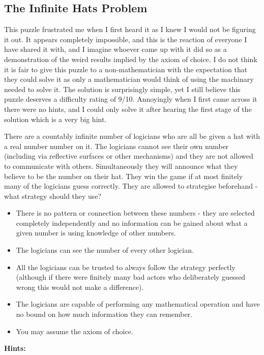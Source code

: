\subsection{The Infinite Hats Problem}

This puzzle frustrated me when I first heard it as I knew I would not be figuring it out. It appears completely impossible, and this is the reaction of everyone I have shared it with, and I imagine whoever came up with it did so as a demonstration of the weird results implied by the axiom of choice. I do not think it is fair to give this puzzle to a non-mathematician with the expectation that they could solve it as only a mathematician would think of using the machinary needed to solve it. The solution is surprisingly simple, yet I still believe this puzzle deserves a difficulty rating of 9/10. Annoyingly when I first came across it there were no hints, and I could only solve it after hearing the first stage of the solution which is a very big hint.

There are a countably infinite number of logicians who are all be given a hat with a real number number on it. The logicians cannot see their own number (including via reflective surfaces or other mechanisms) and they are not allowed to communicate with others. Simultaneously they will announce what they believe to be the number on their hat. They win the game if at most finitely many of the logicians guess correctly. They are allowed to strategise beforehand - what strategy should they use?

\begin{itemize}
	\item There is no pattern or connection between these numbers - they are selected completely independently and no information can be gained about what a given number is using knowledge of other numbers.
	\item The logicians can see the number of every other logician.
	\item All the logicians can be trusted to always follow the strategy perfectly (although if there were finitely many bad actors who deliberately guessed wrong this would not make a difference).
	\item The logicians are capable of performing any mathematical operation and have no bound on how much information they can remember.
	\item You may assume the axiom of choice.
\end{itemize}

\textbf{Hints:}

